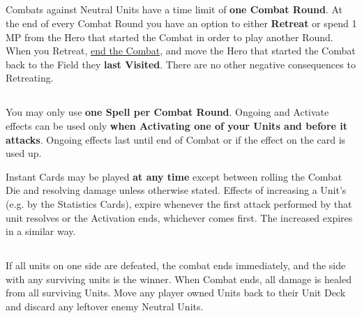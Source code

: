 \begin{multicols}{2}
\subsection*{}
Combats against Neutral Units have a time limit of \textbf{one Combat Round}.
At the end of every Combat Round you have an option to either \textbf{Retreat} or spend 1 MP from the Hero that started the Combat in order to play another Round.
When you Retreat, \hyperlink{Endcombat}{end the Combat}, and move the Hero that started the Combat back to the Field they \textbf{last Visited}.
There are no other negative consequences to Retreating.\par


\subsection*{}
You may only use \textbf{one Spell per Combat Round}.
Ongoing  and  Activate effects can be used only \textbf{when Activating one of your Units and before it attacks}.
Ongoing effects last until end of Combat or if the effect on the card is used up.\par
Instant  Cards may be played \textbf{at any time} except between rolling the Combat Die and resolving damage unless otherwise stated.
Effects of increasing a Unit's  (e.g. by the Statistics Cards), expire whenever the first attack performed by that unit resolves or the Activation ends, whichever comes first.
The increased  expires in a similar way.

\subsection*{}
If all units on one side are defeated, the combat ends immediately, and the side with any surviving units is the winner.
When Combat ends, all damage is healed from all surviving Units.
Move any player owned Units back to their Unit Deck and discard any leftover enemy Neutral Units.


\end{multicols}
